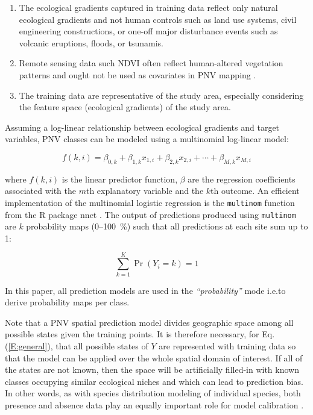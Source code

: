\documentclass[fleqn,10pt,lineno]{wlpeerj} %
\begin{document}
\begin{enumerate}
\item The ecological gradients captured in training data reflect only natural ecological gradients and not human controls such as land use systems, civil engineering constructions, or one-off major disturbance events such as volcanic eruptions, floods, or tsunamis. 
\item Remote sensing data such NDVI often reflect human-altered vegetation patterns and ought not be used as covariates in PNV mapping \citep{leong2015remote}.
\item The training data are representative of the study area, especially considering the feature space (ecological gradients) of the study area.
\end{enumerate}

Assuming a log-linear relationship between ecological gradients and target variables, PNV classes can be modeled using a multinomial log-linear model:

\begin{equation}\label{E:multinom}
f(k,i) = \beta_{0,k} + \beta_{1,k} x_{1,i}  + \beta_{2,k} x_{2,i} + \cdots + \beta_{M,k} x_{M,i}
\end{equation}

\noindent where $f(k,i)$ is the linear predictor function, $\beta$ are the regression coefficients associated with the $m$th explanatory variable and the $k$th outcome. An efficient implementation of the multinomial logistic regression is the \texttt{multinom} function from the \textsf{R} package \textsf{nnet} \citep{Venables2002Springer}. The output of predictions produced using \texttt{multinom} are $k$ probability maps (0--\SI{100}{\percent}) such that all predictions at each site sum up to 1:

\begin{equation}
\sum_{k=1}^{K} \Pr(Y_i=k) = 1
\end{equation}

In this paper, all prediction models are used in the \emph{``probability''} mode i.e.\@ to derive probability maps per class.\par 

Note that a PNV spatial prediction model divides geographic space among all possible states given the training points. It is therefore necessary, for Eq.(\ref{E:general}), that all possible states of $Y$ are represented with training data so that the model can be applied over the whole spatial domain of interest. If all of the states are not known, then the space will be artificially filled-in with known classes occupying similar ecological niches and which can lead to prediction bias. In other words, as with species distribution modeling of individual species, both presence and absence data play an equally important role for model calibration \citep{elith2009species}.\par 
\end{document}
